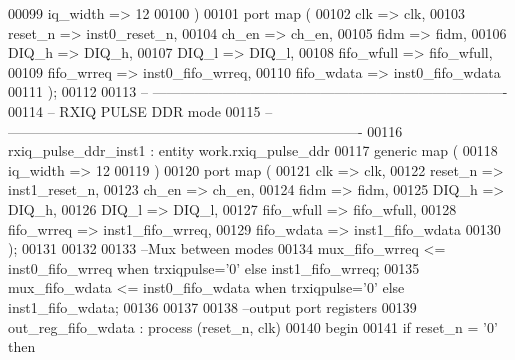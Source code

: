 \begin{DoxyCode}
00099       iq_width    => \textcolor{vhdllogic}{12}
00100    \textcolor{vhdlchar}{)}
00101    \textcolor{keywordflow}{port} \textcolor{keywordflow}{map} (
00102       clk         => clk,
00103       reset_n     => inst0_reset_n,
00104       ch_en       => ch_en,
00105       fidm         => fidm,
00106       DIQ_h         => DIQ_h,
00107         DIQ_l          => DIQ_l,
00108       fifo_wfull  => fifo_wfull,
00109       fifo_wrreq  => inst0_fifo_wrreq,
00110       fifo_wdata  => inst0_fifo_wdata
00111         \textcolor{vhdlchar}{)}; 
00112  
00113 \textcolor{keyword}{-- ----------------------------------------------------------------------------}
00114 \textcolor{keyword}{-- RXIQ PULSE DDR mode}
00115 \textcolor{keyword}{-- ---------------------------------------------------------------------------- }
00116   rxiq\_pulse\_ddr\_inst1 : \textcolor{keywordflow}{entity} work.rxiq_pulse_ddr
00117    \textcolor{keywordflow}{generic} \textcolor{keywordflow}{map} (
00118       iq_width    => \textcolor{vhdllogic}{12}
00119    \textcolor{vhdlchar}{)}
00120    \textcolor{keywordflow}{port} \textcolor{keywordflow}{map} (
00121       clk         => clk,
00122       reset_n     => inst1_reset_n,
00123       ch_en       => ch_en,
00124       fidm         => fidm,
00125       DIQ_h         => DIQ_h,
00126         DIQ_l          => DIQ_l,
00127       fifo_wfull  => fifo_wfull,
00128       fifo_wrreq  => inst1_fifo_wrreq,
00129       fifo_wdata  => inst1_fifo_wdata
00130         \textcolor{vhdlchar}{)};
00131         
00132         
00133 \textcolor{keyword}{ --Mux between modes       }
00134 \textcolor{vhdlchar}{mux_fifo_wrreq} \textcolor{vhdlchar}{<=} \textcolor{vhdlchar}{inst0_fifo_wrreq} \textcolor{keywordflow}{when} \textcolor{vhdlchar}{trxiqpulse}\textcolor{vhdlchar}{=}\textcolor{vhdlchar}{'}\textcolor{vhdllogic}{}\textcolor{vhdllogic}{0}\textcolor{vhdlchar}{'} \textcolor{keywordflow}{else} \textcolor{vhdlchar}{inst1_fifo_wrreq};
00135 \textcolor{vhdlchar}{mux_fifo_wdata} \textcolor{vhdlchar}{<=} \textcolor{vhdlchar}{inst0_fifo_wdata} \textcolor{keywordflow}{when} \textcolor{vhdlchar}{trxiqpulse}\textcolor{vhdlchar}{=}\textcolor{vhdlchar}{'}\textcolor{vhdllogic}{}\textcolor{vhdllogic}{0}\textcolor{vhdlchar}{'} \textcolor{keywordflow}{else} \textcolor{vhdlchar}{inst1_fifo_wdata}; 
00136 
00137 
00138 \textcolor{keyword}{--output port registers    }
00139 out\_reg\_fifo\_wdata : \textcolor{keywordflow}{process} (reset_n, clk)
00140 \textcolor{vhdlkeyword}{begin}
00141    \textcolor{keywordflow}{if} \textcolor{vhdlchar}{reset_n} \textcolor{vhdlchar}{=} \textcolor{vhdlchar}{'}\textcolor{vhdllogic}{}\textcolor{vhdllogic}{0}\textcolor{vhdlchar}{'} \textcolor{keywordflow}{then} 

\end{DoxyCode}
